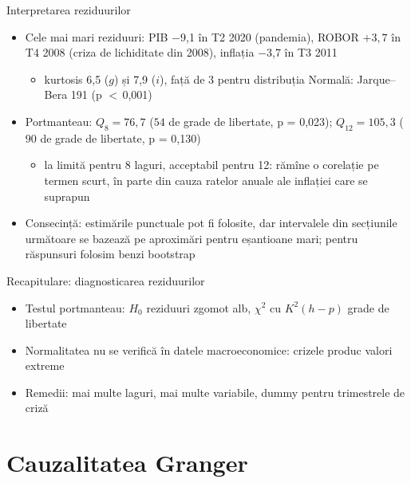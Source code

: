 \begin{frame}{Interpretarea reziduurilor}
\itemsize{\small}
\begin{itemize}
    \item Cele mai mari reziduuri: PIB $-$9{,}1 în T2 2020 (pandemia), ROBOR $+3{,}7$ în T4 2008 (criza de lichiditate din 2008), inflația $-$3{,}7 în T3 2011
    \begin{itemize}
        \item kurtosis 6{,}5 ($g$) și 7{,}9 ($i$), față de 3 pentru distribuția Normală: Jarque--Bera 191 (p $<$\,0{,}001)
    \end{itemize}
    \item Portmanteau: $Q_8 = 76{,}7$ ($54$ de grade de libertate, p = 0{,}023); $Q_{12} = 105{,}3$ ($90$ de grade de libertate, p = 0{,}130)
    \begin{itemize}
        \item la limită pentru 8 laguri, acceptabil pentru 12: rămîne o corelație pe termen scurt, în parte din cauza ratelor anuale ale inflației care se suprapun
    \end{itemize}
    \item Consecință: estimările punctuale pot fi folosite, dar intervalele din secțiunile următoare se bazează pe aproximări pentru eșantioane mari; pentru răspunsuri folosim benzi bootstrap
\end{itemize}
\end{frame}

\begin{frame}{Recapitulare: diagnosticarea reziduurilor}
\itemsize{\small}
\begin{itemize}
    \item Testul portmanteau: $H_0$ reziduuri zgomot alb, $\chi^2$ cu $K^2(h - p)$ grade de libertate
    \item Normalitatea nu se verifică în datele macroeconomice: crizele produc valori extreme
    \item Remedii: mai multe laguri, mai multe variabile, dummy pentru trimestrele de criză
\end{itemize}
\end{frame}


\section{Cauzalitatea Granger}

